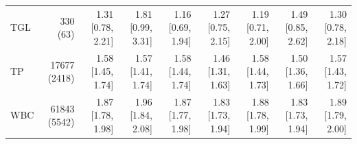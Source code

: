 \begin{table}[ht]
\begin{tabular}{lrrrrrrrr}
TGL & 330 (63) & 1.31 [0.78, 2.21] & 1.81 [0.99, 3.31] & 1.16 [0.69, 1.94] & 1.27 [0.75, 2.15] & 1.19 [0.71, 2.00] & 1.49 [0.85, 2.62] & 1.30 [0.78, 2.18] \\
TP & 17677 (2418) & 1.58 [1.45, 1.74] & 1.57 [1.41, 1.74] & 1.58 [1.44, 1.74] & 1.46 [1.31, 1.63] & 1.58 [1.44, 1.73] & 1.50 [1.36, 1.66] & 1.57 [1.43, 1.72] \\
WBC & 61843 (5542) & 1.87 [1.78, 1.98] & 1.96 [1.84, 2.08] & 1.87 [1.77, 1.98] & 1.83 [1.73, 1.94] & 1.88 [1.78, 1.99] & 1.83 [1.73, 1.94] & 1.89 [1.79, 2.00] \\
\bottomrule
\end{tabular}
\label{tab:13_cox_eicu_mortality}
\end{table}